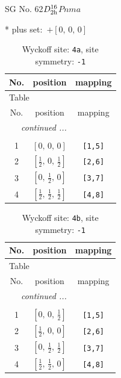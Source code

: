 \documentclass[fleqn,8pt]{jsarticle}
\begin{document}
\setcounter{MaxMatrixCols}{32}

\renewcommand{\tablename}{Table~}
\renewcommand{\figurename}{Figure~}
\begin{center}
\LARGE
SG No. 62\quad$D_{\rm 2h}^{16}$\quad$Pnma$\quad[ orthorhombic ]
\end{center}
* plus set:\,\,\,$+\left[ 0,\, 0,\, 0 \right]$
\renewcommand{\arraystretch}{1.2}
\begin{longtable}{ccc}
\caption{Wyckoff site: {\tt 4a}, site symmetry: {\tt -1}}
 \\
 \hline \hline
No. & position & mapping \\ \hline \endfirsthead

\multicolumn{2}{l}{\tablename\ \thetable{}} \\
 \hline \hline
No. & position & mapping \\ \hline \endhead

 \hline \hline
\multicolumn{2}{r}{\footnotesize\it continued ...} \\ \endfoot

 \hline \hline
\multicolumn{2}{r}{} \\ \endlastfoot

1 & $\left[ 0,\, 0,\, 0 \right]$ & {\tt [1,5]} \\ \hline
2 & $\left[ \frac{1}{2},\, 0,\, \frac{1}{2} \right]$ & {\tt [2,6]} \\ \hline
3 & $\left[ 0,\, \frac{1}{2},\, 0 \right]$ & {\tt [3,7]} \\ \hline
4 & $\left[ \frac{1}{2},\, \frac{1}{2},\, \frac{1}{2} \right]$ & {\tt [4,8]} \\
\end{longtable}
\renewcommand{\arraystretch}{1.2}
\begin{longtable}{ccc}
\caption{Wyckoff site: {\tt 4b}, site symmetry: {\tt -1}}
 \\
 \hline \hline
No. & position & mapping \\ \hline \endfirsthead

\multicolumn{2}{l}{\tablename\ \thetable{}} \\
 \hline \hline
No. & position & mapping \\ \hline \endhead

 \hline \hline
\multicolumn{2}{r}{\footnotesize\it continued ...} \\ \endfoot

 \hline \hline
\multicolumn{2}{r}{} \\ \endlastfoot

1 & $\left[ 0,\, 0,\, \frac{1}{2} \right]$ & {\tt [1,5]} \\ \hline
2 & $\left[ \frac{1}{2},\, 0,\, 0 \right]$ & {\tt [2,6]} \\ \hline
3 & $\left[ 0,\, \frac{1}{2},\, \frac{1}{2} \right]$ & {\tt [3,7]} \\ \hline
4 & $\left[ \frac{1}{2},\, \frac{1}{2},\, 0 \right]$ & {\tt [4,8]} \\
\end{longtable}
\end{document}

